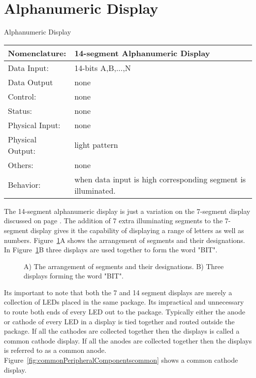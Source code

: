 \section{Alphanumeric Display}
\label{page:alpha}
\begin{buildingblock}{Alphanumeric Display }
\begin{tabular}{|l|p{3.5in}|} \hline
Nomenclature:  & 14-segment Alphanumeric Display  \\ \hline
Data Input:    & 14-bits A,B,...,N     \\ \hline
Data Output    & none    \\ \hline
Control:       & none           \\ \hline
Status:        & none                                   \\ \hline
Physical Input:& none		\\ \hline
Physical Output:& light pattern		\\ \hline
Others:        & none                   \\ \hline
Behavior:      & when data input is high corresponding segment 
is illuminated. \\ \hline
\end{tabular}
\end{buildingblock}

The 14-segment alphanumeric display is just a variation on the
7-segment display discussed on page \pageref{page:7seg}.  The addition
of 7 extra illuminating segments to the 7-segment display gives
it the capability of displaying a range of letters as well as
numbers.  Figure~\ref{fig:commonPeripheralComponentsalpha}A shows the arrangement of segments
and their designations.  In Figure~\ref{fig:commonPeripheralComponentsalpha}B three displays
are used together to form the word "BIT".

\begin{figure}[ht]
\caption{A) The arrangement of segments and their designations.  B) Three
displays forming the word "BIT".}
\label{fig:commonPeripheralComponentsalpha}
\end{figure}

Its important to note that both the 7 and 14 segment displays are
merely a collection of LEDs placed in the same package.  Its impractical 
and unnecessary to route both ends of every LED out to the package.
Typically either the anode or cathode of every LED in a display is 
tied together
and routed outside the package.  If all the cathodes are collected
together then the displays is called a common cathode display.  If
all the anodes are collected together then the displays is referred
to as a common anode.  Figure~\ref{fig:commonPeripheralComponentscommon} shows a common
cathode display.

